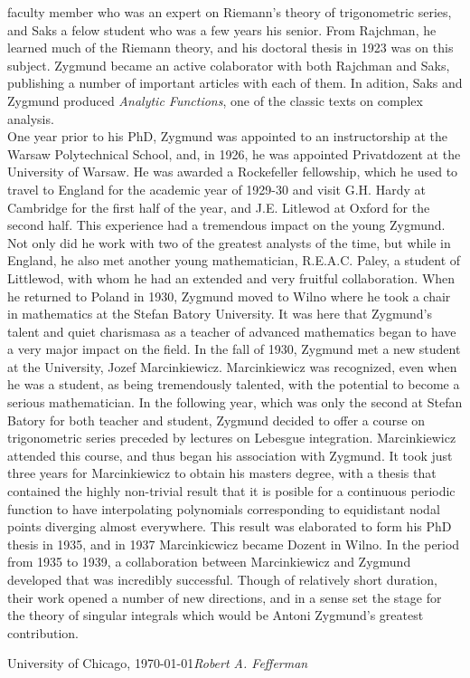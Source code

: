 faculty member who was an expert on Riemann's theory of trigonometric series, and Saks a felow student 
who was a few years his senior. From Rajchman, he learned much of the Riemann theory, and his doctoral thesis 
in 1923 was on this subject. Zygmund became an active colaborator with both Rajchman and Saks, publishing 
a number of important articles with each of them. In adition, Saks and Zygmund produced \textit{Analytic Functions}, 
one of the classic texts on complex analysis.\\
\indent One year prior to his PhD, Zygmund was appointed to an instructorship at the Warsaw Polytechnical 
School, and, in 1926, he was appointed Privatdozent at the University of Warsaw. He was awarded a Rockefeller fellowship, 
which he used to travel to England for the academic year of 1929-30 and visit G.H. Hardy at Cambridge 
for the first half of the year, and J.E. Litlewod at Oxford for the second half. This experience had a tremendous 
impact on the young Zygmund. Not only did he work with two of the greatest analysts of the time, but while in 
England, he also met another young mathematician, R.E.A.C. Paley, a student of Littlewod, with whom he had 
an extended and very fruitful collaboration. When he returned to Poland in 1930, Zygmund moved to Wilno where 
he took a chair in mathematics at the Stefan Batory University. It was here that Zygmund's talent and quiet charismasa 
as a teacher of advanced mathematics began to have a very major impact on the field. In the fall of 1930, 
Zygmund met a new student at the University, Jozef Marcinkiewicz. Marcinkiewicz was recognized, even when he 
was a student, as being tremendously talented, with the potential to become a serious mathematician. In the 
following year, which was only the second at Stefan Batory for both teacher and student, Zygmund decided to 
offer a course on trigonometric series preceded by lectures on Lebesgue integration. Marcinkiewicz attended 
this course, and thus began his association with Zygmund. It took just three years for Marcinkiewicz to obtain 
his masters degree, with a thesis that contained the highly non-trivial result that it is posible for 
a continuous periodic function to have interpolating polynomials corresponding to equidistant nodal points 
diverging almost everywhere. This result was elaborated to form his PhD thesis in 1935, and in 1937 Marcinkicwicz 
became Dozent in Wilno. In the period from 1935 to 1939, a collaboration between Marcinkiewicz and Zygmund 
developed that was incredibly successful. Though of relatively short duration, their work opened a number of 
new directions, and in a sense set the stage for the theory of singular integrals which would be Antoni Zygmund's 
greatest contribution.\\
\indent 






\vspace{\baselineskip}
\begin{flushright}\noindent
University of Chicago, \today \hfill {\it Robert A. Fefferman}\\
\end{flushright}


